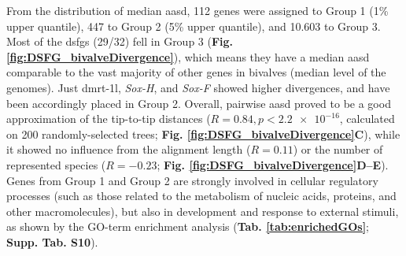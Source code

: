 \documentclass[../main.tex]{subfiles}
\begin{document}
From the distribution of median \gls{aasd}, 112 genes were assigned to Group 1 (1\% upper quantile), 447 to Group 2 (5\% upper quantile), and 10.603 to Group 3. Most of the \glspl{dsfg} (29/32) fell in Group 3 (\textbf{Fig. \ref{fig:DSFG_bivalveDivergence}}), which means they have a median \gls{aasd} comparable to the vast majority of other genes in bivalves (median level of the genomes). Just \gls{dmrt-1l}, \textit{Sox-H}, and \textit{Sox-F} showed higher divergences, and have been accordingly placed in Group 2. Overall, pairwise \gls{aasd} proved to be a good approximation of the tip-to-tip distances ($R = 0.84, p < \num{2.2e-16}$, calculated on 200 randomly-selected trees; \textbf{Fig. \ref{fig:DSFG_bivalveDivergence}C}), while it showed no influence from the alignment length ($R = 0.11$) or the number of represented species ($R = -0.23$; \textbf{Fig. \ref{fig:DSFG_bivalveDivergence}D--E}). Genes from Group 1 and Group 2 are strongly involved in cellular regulatory processes (such as those related to the metabolism of nucleic acids, proteins, and other macromolecules), but also in development and response to external stimuli, as shown by the GO-term enrichment analysis (\textbf{Tab. \ref{tab:enrichedGOs}}; \textbf{Supp. Tab. S10}).
\end{document}
